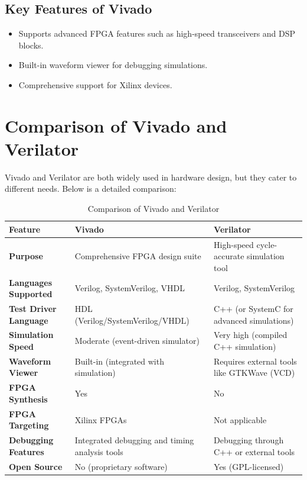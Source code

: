 \subsection{Key Features of Vivado}
\begin{itemize}
    \item Supports advanced FPGA features such as high-speed transceivers and DSP blocks.
    \item Built-in waveform viewer for debugging simulations.
    \item Comprehensive support for Xilinx devices.
\end{itemize}

\section{Comparison of Vivado and Verilator}
Vivado and Verilator are both widely used in hardware design, but they cater to different needs. Below is a detailed comparison:

\begin{table}[htbp]
\renewcommand{\arraystretch}{2} %
\centering
\begin{tabular}{@{}p{4cm}p{6cm}p{6cm}@{}}
\toprule
\textbf{Feature}              & \textbf{Vivado}                                & \textbf{Verilator}                              \\ \midrule
\textbf{Purpose}              & Comprehensive FPGA design suite                & High-speed cycle-accurate simulation tool       \\
\textbf{Languages Supported}  & Verilog, SystemVerilog, VHDL                   & Verilog, SystemVerilog                         \\
\textbf{Test Driver Language} & HDL (Verilog/SystemVerilog/VHDL)               & C++ (or SystemC for advanced simulations)      \\
\textbf{Simulation Speed}     & Moderate (event-driven simulator)              & Very high (compiled C++ simulation)            \\
\textbf{Waveform Viewer}      & Built-in (integrated with simulation)          & Requires external tools like GTKWave (VCD)     \\
\textbf{FPGA Synthesis}       & Yes                                           & No                                             \\
\textbf{FPGA Targeting}       & Xilinx FPGAs                                   & Not applicable                                 \\
\textbf{Debugging Features}   & Integrated debugging and timing analysis tools & Debugging through C++ or external tools        \\
\textbf{Open Source}          & No (proprietary software)                      & Yes (GPL-licensed)                             \\ \bottomrule
\end{tabular}
\caption{Comparison of Vivado and Verilator}
\label{tab:vivado_vs_verilator}
\end{table}


